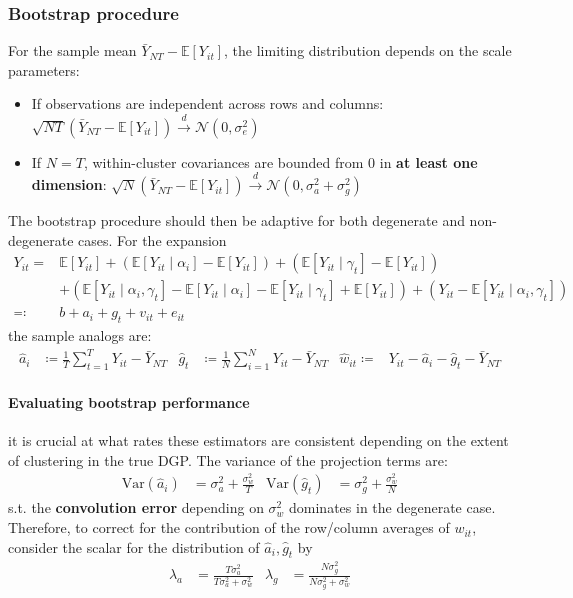 \documentclass[twoside]{article}
\begin{document}
\subsubsection{Bootstrap procedure}
For the sample mean $\bar{Y}_{NT} - \mathbb{E}\left[Y_{it}\right]$, the limiting distribution depends on the scale parameters:
\begin{itemize}
    \item If observations are independent across rows and columns: $\sqrt{NT}\left(\bar{Y}_{NT}-\mathbb{E}\left[Y_{it}\right]\right) \xrightarrow{d} \mathcal{N}\left(0,\sigma^2_e\right)$
    \item If $N=T$, within-cluster covariances are bounded from 0 in \textbf{at least one dimension}: $\sqrt{N}\left(\bar{Y}_{NT}-\mathbb{E}\left[Y_{it}\right]\right) \xrightarrow{d}\mathcal{N}\left(0,\sigma^2_a+\sigma^2_g\right)$
\end{itemize}
The bootstrap procedure should then be adaptive for both degenerate and non-degenerate cases. For the expansion
\begin{align}\label{eq:sample_mean_decomp}
    Y_{it} =& \mathbb{E}\left[Y_{it}\right] + \left(\mathbb{E}\left[Y_{it}\mid \alpha_i\right] - \mathbb{E}\left[Y_{it}\right] \right) + \left( \mathbb{E}\left[Y_{it}\mid \gamma_t\right] - \mathbb{E}\left[Y_{it}\right] \right) \\ \nonumber
    &+ \left( \mathbb{E}\left[Y_{it}\mid \alpha_i,\gamma_t\right] - \mathbb{E}\left[Y_{it}\mid \alpha_i\right] - \mathbb{E}\left[Y_{it}\mid \gamma_t\right] + \mathbb{E}\left[Y_{it}\right]\right) + \left( Y_{it}-\mathbb{E}\left[Y_{it}\mid \alpha_i,\gamma_t\right] \right) \\ \nonumber
    \eqcolon & b+ a_i + g_t + v_{it} + e_{it}
\end{align}
the sample analogs are:
\begin{align*}
    \hat{a}_i &\coloneq \frac{1}{T}\sum^T_{t=1}Y_{it}-\bar{Y}_{NT} & \hat{g}_t &\coloneq \frac{1}{N}\sum^N_{i=1}Y_{it} - \bar{Y}_{NT} & \hat{w}_{it}\coloneq & Y_{it} - \hat{a}_i-\hat{g}_t -\bar{Y}_{NT}
\end{align*}

\paragraph*{Evaluating bootstrap performance} it is crucial at what rates these estimators are consistent depending on the extent of clustering in the true DGP.
The variance of the projection terms are: 
\begin{align*}
    \mathrm{Var}\left(\hat{a}_i\right) &= \sigma^2_a + \frac{\sigma^2_w}{T} & \mathrm{Var}\left(\hat{g}_t\right) &= \sigma^2_g + \frac{\sigma^2_w}{N}
\end{align*}
s.t. the \textbf{convolution error} depending on $\sigma^2_w$ dominates in the degenerate case. Therefore, to correct for the contribution of the row/column averages of $w_{it}$, consider the scalar for the distribution of $\hat{a}_i,\hat{g}_t$ by 
\begin{align*}
    \lambda_a &= \frac{T\sigma^2_a}{T\sigma^2_a +\sigma^2_w} & \lambda_g &= \frac{N\sigma^2_g}{N\sigma^2_g +\sigma^2_w} 
\end{align*}
\end{document}
